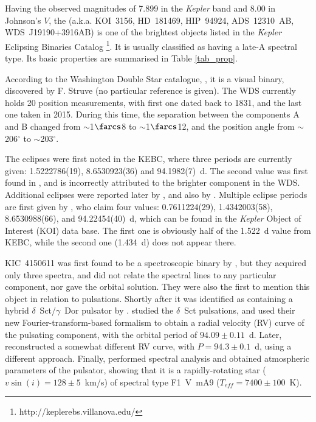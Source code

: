 \documentclass{aa}
\newcommand{\kep}{{\it Kepler }}
\begin{document}
Having the observed magnitudes of 7.899 in the \kep band and 8.00 in
Johnson's $V$, the  (a.k.a. KOI~3156, HD~181469, HIP~94924, ADS~12310~AB,
WDS~J19190+3916AB) is one of the brightest objects listed in the \kep Eclipsing Binaries 
Catalog \citep[KEBC;][]{prs11,sla11,kir16}\footnote{http://keplerebs.villanova.edu/}.
It is usually classified as having a late-A spectral type. Its basic properties are 
summarised in Table \ref{tab_prop}.

According to the Washington Double Star catalogue, \citep[WDS;][]{mas01}, it is a 
visual binary, discovered by F. Struve (no particular reference is given). 
The WDS currently holds 20 position measurements, with first one dated back to
1831, and the last one taken in 2015. During this time, the separation between the 
components A and B changed from $\sim$1$\farcs$8 to $\sim$1$\farcs$12, 
and the position angle from $\sim$206$^\circ$ to $\sim$203$^\circ$.

The eclipses were first noted in the KEBC, where three periods are currently given:
1.5222786(19), 8.6530923(36) and 94.1982(7)~d. The second value was first found in
\citet{prs11}, and is incorrectly attributed to the brighter component in the WDS.
Additional eclipses were reported later by \citet{sla11}, and also by \citet{oro15}.
Multiple eclipse periods are first given by \citet{row15}, who claim four values:
0.7611224(29), 1.4342003(58), 8.6530988(66), and 94.22454(40)~d, which can be found in
the \kep Object of Interest (KOI) data base. The first one is 
obviously half of the 1.522~d value from KEBC, while the second one (1.434~d) 
does not appear there.

KIC~4150611 was first found to be a spectroscopic binary by \citet{mol11}, but they acquired 
only three spectra, and did not relate the spectral lines to any particular component, 
nor gave the orbital solution. They were also the first to mention this object in relation 
to pulsations. Shortly after it was identified as containing a hybrid $\delta$~Sct/$\gamma$~Dor 
pulsator by \citet{uyt11}. \citet{shi12} studied the $\delta$~Sct pulsations, and used
their new Fourier-transform-based formalism to obtain a radial velocity (RV) curve
of the pulsating component, with the orbital period of $94.09\pm0.11$~d. Later, \citet{bal14}
reconstructed a somewhat different RV curve, with $P=94.3\pm0.1$~d, using a different approach. 
Finally, \citet{nie15} performed spectral analysis and obtained atmospheric parameters of the
pulsator, showing that it is a rapidly-rotating star ($v\sin(i)=128\pm5$~km/s)
of spectral type F1~V~mA9 ($T_{eff}=7400\pm100$~K).
\end{document}

